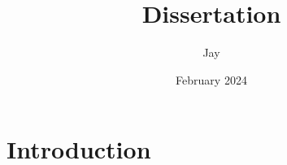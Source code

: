 \documentclass{article}
\title{Dissertation}
\author{Jay }
\date{February 2024}
\begin{document}
\maketitle

\section{Introduction}
\end{document}
